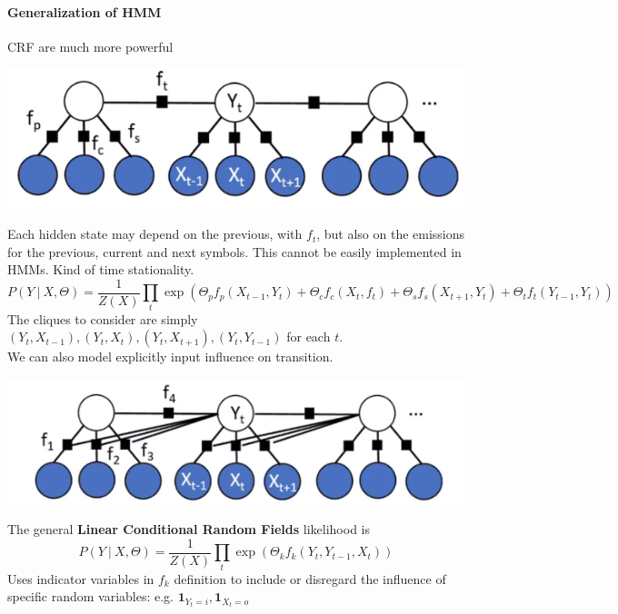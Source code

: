 \documentclass[10pt]{report}
\begin{document}
\paragraph{Generalization of HMM} CRF are much more powerful\begin{center}
	\includegraphics[scale=0.4]{37.png}
\end{center}
Each hidden state may depend on the previous, with $f_t$, but also on the emissions for the previous, current and next symbols. This cannot be easily implemented in HMMs. Kind of time stationality.
$$P(Y\:|\:X,\Theta) = \frac{1}{Z(X)}\prod_t \exp\left(\Theta_pf_p(X_{t-1},Y_t) + \Theta_cf_c(X_t,f_t) + \Theta_sf_s(X_{t+1},Y_t)+\Theta_tf_t(Y_{t-1},Y_t)\right)$$
The cliques to consider are simply $(Y_t, X_{t-1}), (Y_t, X_{t}), (Y_t, X_{t+1}), (Y_t, Y_{t-1})$ for each $t$.\\
We can also model explicitly input influence on transition.
\begin{center}
	\includegraphics[scale=0.5]{38.png}
\end{center}
The general \textbf{Linear Conditional Random Fields} likelihood is
$$P(Y\:|\:X,\Theta)=\frac{1}{Z(X)}\prod_t\exp\left(\Theta_kf_k(Y_t,Y_{t-1},X_t)\right)$$
Uses indicator variables in $f_k$ definition to include or disregard the influence of specific random variables: e.g. $\mathbf{1}_{Y_t=i}, \mathbf{1}_{X_t=o}$
\end{document}
